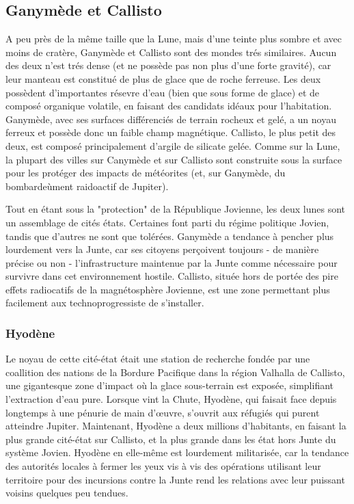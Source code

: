 \subsection{Ganymède et Callisto} \label{sec:ganymede-callisto} 

A peu près de la même taille que la Lune, mais d'une teinte plus sombre et avec moins de cratère, Ganymède et Callisto sont des mondes trés similaires. Aucun des deux n'est trés dense (et ne possède pas non plus d'une forte gravité), car leur manteau est constitué de plus de glace que de roche ferreuse. Les deux possèdent d'importantes résevre d'eau (bien que sous forme de glace) et de composé organique volatile, en faisant des candidats idéaux pour l'habitation. Ganymède, avec ses surfaces différenciés de terrain rocheux et gelé, a un noyau ferreux et possède donc un faible champ magnétique. Callisto, le plus petit des deux, est composé principalement d'argile de silicate gelée. Comme sur la Lune, la plupart des villes sur Canymède et sur Callisto sont construite sous la surface pour les protéger des impacts de météorites (et, sur Ganymède, du bombardeùment raidoactif de Jupiter). 

Tout en étant sous la "protection" de la République Jovienne, les deux lunes sont un assemblage de cités états. Certaines font parti du régime politique Jovien, tandis que d'autres ne sont que tolérées. Ganymède a tendance à pencher plus lourdement vers la Junte, car ses citoyens perçoivent toujours - de manière précise ou non - l'infrastructure maintenue par la Junte comme nécessaire pour survivre dans cet environnement hostile. Callisto, située hors de portée des pire effets radiocatifs de la magnétosphère Jovienne, est une zone permettant plus facilement aux technoprogressiste de s'installer. 

\subsubsection{Hyodène} \label{sec:hyoden} 

Le noyau de cette cité-état était une station de recherche fondée par une coallition des nations de la Bordure Pacifique dans la région Valhalla de Callisto, une gigantesque zone d'impact où la glace sous-terrain est exposée, simplifiant l'extraction d'eau pure. Lorsque vint la Chute, Hyodène, qui faisait face depuis longtemps à une pénurie de main d'œuvre, s'ouvrit aux réfugiés qui purent atteindre Jupiter. Maintenant, Hyodène a deux millions d'habitants, en faisant la plus grande cité-état sur Callisto, et la plus grande dans les état hors Junte du système Jovien. Hyodène en elle-même est lourdement militarisée, car la tendance des autorités locales à fermer les yeux vis à vis des opérations utilisant leur territoire pour des incursions contre la Junte rend les relations avec leur puissant voisins quelques peu tendues. 

